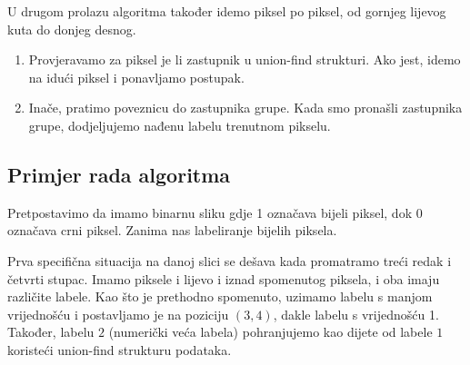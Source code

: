 \documentclass[times, utf8, diplomski]{fer}
\theoremstyle{definition}
\begin{document}
U drugom prolazu algoritma također idemo piksel po piksel, od gornjeg lijevog kuta do donjeg desnog.
\begin{enumerate}
\item Provjeravamo za piksel je li zastupnik u union-find strukturi. Ako jest, idemo na idući piksel i ponavljamo postupak.
\item Inače, pratimo poveznicu do zastupnika grupe. Kada smo pronašli zastupnika grupe, dodjeljujemo nađenu labelu trenutnom pikselu.
\end{enumerate}

\subsection{Primjer rada algoritma}
Pretpostavimo da imamo binarnu sliku gdje 1 označava bijeli piksel, dok 0 označava crni piksel. Zanima nas labeliranje bijelih piksela.
\begin{center}
\end{center}

Prva specifična situacija na danoj slici se dešava kada promatramo treći redak i četvrti stupac. Imamo piksele i lijevo i iznad spomenutog piksela, i oba imaju različite labele. Kao što je prethodno spomenuto, uzimamo labelu s manjom vrijednošću i postavljamo je na poziciju $(3,4)$, dakle labelu s vrijednošću 1. Također, labelu $2$ (numerički veća labela) pohranjujemo kao dijete od labele $1$ koristeći union-find strukturu podataka.
\end{document}
